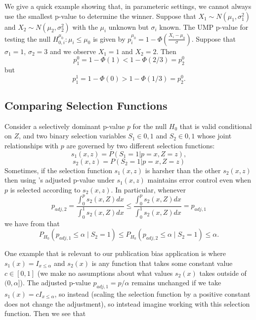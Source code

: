 \documentclass{article}
\begin{document}
\begin{appendix}
We give a quick example showing that, in parameteric settings, we cannot always use the smallest p-value to determine the winner. Suppose that $X_1 \sim N(\mu_1, \sigma_1^2)$ and $X_2 \sim N(\mu_2, \sigma_2^2)$ with the $\mu_i$ unknown but $\sigma_i$ known. The UMP p-value for testing the null $H_{0, i}^{\mu_0}: \mu_i \leq \mu_0$ is given by $p^{\mu_0}_i = 1- \Phi(\frac{X_i - \mu_0}{\sigma})$. Suppose that $\sigma_1 = 1$, $\sigma_2 = 3$ and we observe $X_1 = 1$ and $X_2=2$. Then
\begin{equation*}
    p^0_1 = 1 - \Phi(1) < 1 - \Phi(2/3) = p^0_2
\end{equation*}
but 
\begin{equation*}
    p^1_1 = 1 - \Phi(0) > 1 - \Phi(1/3) = p^0_2.
\end{equation*}

\subsection{Comparing Selection Functions}
\label{sec:publication_bias_appdx}

Consider a selectively dominant p-value $p$ for the null $H_0$ that is valid conditional on $Z$, and two binary selection variables $S_1 \in {0, 1}$ and $S_2 \in {0, 1}$ whose joint relationships with $p$ are governed by two different selection functions:
\begin{equation*}
    s_1(x, z) = P(S_1 = 1 | p=x, Z=z),
\end{equation*} 
\begin{equation*}
    s_2(x, z) = P(S_2 = 1 | p=x, Z=z)
\end{equation*} 
Sometimes, if the selection function $s_1(x, z)$ is harsher than the other $s_2(x, z)$ then using 's adjusted p-value under $s_1(x, z)$ maintains error control even when $p$ is selected according to $s_2(x, z)$. In particular, whenever
\begin{equation*}
    p_{adj, 2} =  \frac{\int_0^p s_2(x, Z) dx }{\int_0^1 s_2(x, Z) dx}  \leq \frac{\int_0^p s_2(x, Z) dx }{\int_0^1 s_2(x, Z) dx} = p_{adj, 1}
\end{equation*}
we have from  that 
\begin{equation*}
    P_{H_0}(p_{adj, 1}  \leq \alpha \mid S_2 = 1 ) \leq   P_{H_0}(p_{adj, 2}  \leq \alpha \mid S_2 = 1 )  \leq \alpha.
\end{equation*}

One example that is relevant to our publication bias application is where $s_1(x) = I_{x \leq \alpha}$ and $s_2(x)$ is any function that takes some constant value $c \in [0, 1]$ (we make no assumptions about what values $s_2(x)$ takes outside of $(0, \alpha]$). The adjusted p-value $p_{adj, 1} = p/\alpha$ remains unchanged if we take $s_1(x) = cI_{x \leq \alpha}$, so instead (scaling the selection function by a positive constant does not change the adjustment), so intstead imagine working with this selection function. Then we see that 


\end{appendix}
\end{document}
